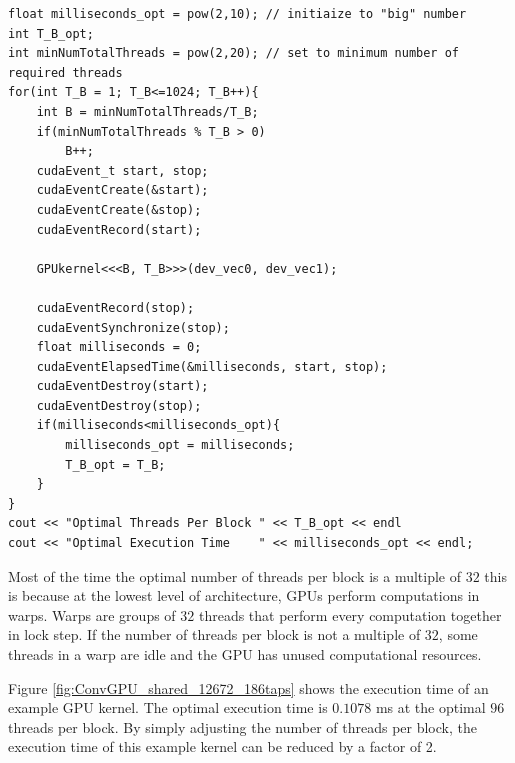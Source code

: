 \singlespacing
\begin{lstlisting}[style=myCUDAstyle,caption={Code snippet for thread optimization.},label={code:threadTiming}]
float milliseconds_opt = pow(2,10); // initiaize to "big" number
int T_B_opt;
int minNumTotalThreads = pow(2,20); // set to minimum number of required threads
for(int T_B = 1; T_B<=1024; T_B++){
	int B = minNumTotalThreads/T_B;
	if(minNumTotalThreads % T_B > 0)
		B++;
	cudaEvent_t start, stop;
	cudaEventCreate(&start);
	cudaEventCreate(&stop);
	cudaEventRecord(start);
	
	GPUkernel<<<B, T_B>>>(dev_vec0, dev_vec1);
	
	cudaEventRecord(stop);
	cudaEventSynchronize(stop);
	float milliseconds = 0;
	cudaEventElapsedTime(&milliseconds, start, stop);
	cudaEventDestroy(start);
	cudaEventDestroy(stop);
	if(milliseconds<milliseconds_opt){
		milliseconds_opt = milliseconds;
		T_B_opt = T_B;
	}
}
cout << "Optimal Threads Per Block " << T_B_opt << endl
cout << "Optimal Execution Time    " << milliseconds_opt << endl;
\end{lstlisting}
\doublespacing

Most of the time the optimal number of threads per block is a multiple of $32$ this is because
at the lowest level of architecture, GPUs perform computations in warps.
Warps are groups of $32$ threads that perform every computation together in lock step.
If the number of threads per block is not a multiple of $32$, some threads in a warp are idle and the GPU has unused computational resources.

Figure \ref{fig:ConvGPU_shared_12672_186taps} shows the execution time of an example GPU kernel.
The optimal execution time is $0.1078$ ms at the optimal $96$ threads per block.
By simply adjusting the number of threads per block, the execution time of this example kernel can be reduced by a factor of 2.

